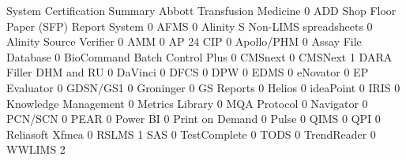 \documentclass{article}
\begin{document}
\begin{Schunk}
\begin{Soutput}
                                           System Certification Summary
  Abbott Transfusion Medicine                                         0
  ADD Shop Floor Paper (SFP) Report System                            0
  AFMS                                                                0
  Alinity S Non-LIMS spreadsheets                                     0
  Alinity Source Verifier                                             0
  AMM                                                                 0
  AP 24 CIP                                                           0
  Apollo/PHM                                                          0
  Assay File Database                                                 0
  BioCommand Batch Control Plus                                       0
  CMSnext                                                             0
  CMSNext                                                             1
  DARA Filler DHM and RU                                              0
  DaVinci                                                             0
  DFCS                                                                0
  DPW                                                                 0
  EDMS                                                                0
  eNovator                                                            0
  EP Evaluator                                                        0
  GDSN/GS1                                                            0
  Groninger                                                           0
  GS Reports                                                          0
  Helios                                                              0
  ideaPoint                                                           0
  IRIS                                                                0
  Knowledge Management                                                0
  Metrics Library                                                     0
  MQA Protocol                                                        0
  Navigator                                                           0
  PCN/SCN                                                             0
  PEAR                                                                0
  Power BI                                                            0
  Print on Demand                                                     0
  Pulse                                                               0
  QIMS                                                                0
  QPI                                                                 0
  Reliasoft Xfmea                                                     0
  RSLMS                                                               1
  SAS                                                                 0
  TestComplete                                                        0
  TODS                                                                0
  TrendReader                                                         0
  WWLIMS                                                              2
                                          

\end{Soutput}
\end{Schunk}
\end{document}
